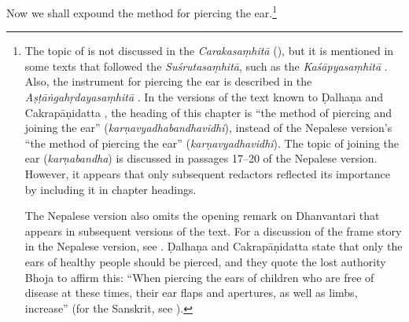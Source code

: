 \begin{translation}    
    
    
    \item [1] Now we shall expound the method for piercing the ear.\footnote{The
topic of   is not discussed in the
\emph{Carakasaṃhitā} (\cite[IB, 326, n.\,175]{meul-hist}), but it is mentioned
in some texts that followed the \emph{Suśrutasaṃhitā}, such as the
\emph{Kaśāpyasaṃhitā} \citep[IIA, 30]{meul-hist}. Also, the instrument for
piercing the ear is described in the \emph{Aṣṭāṅgahṛdayasaṃhitā}
. In the versions of the text known to Ḍalhaṇa
\citep[76]{vulgate} and Cakrapāṇidatta \citep[125]{acar-1939}, the heading of
this chapter is “the method of piercing and joining the ear”
(\emph{karṇavyadhabandhavidhi}), instead of the Nepalese version's “the method
of piercing the ear” (\emph{karṇavyadhavidhi}). The topic of joining the ear
(\emph{karṇabandha}) is discussed in passages 17--20 of the Nepalese version.
However, it appears that only subsequent redactors reflected its importance by
including it in chapter headings. 

 The Nepalese version also omits the opening remark on Dhanvantari that appears in
subsequent versions of the text. For a discussion of the frame story in the
Nepalese version, see \cite{birc-2021}. Ḍalhaṇa \citep[76]{vulgate} and
Cakrapāṇidatta \citep[125]{acar-1939} state that only the ears of healthy people
should be pierced, and they quote the lost authority Bhoja to affirm this: “When
piercing the ears of children who are free of disease at these times, their ear
flaps and apertures, as well as limbs, increase” (for the Sanskrit, see
\cite[76]{vulgate}).}


\end{translation}
